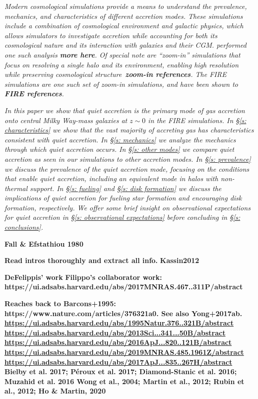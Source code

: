 \documentclass[fleqn,usenatbib]{mnras}
\begin{document}
\textit{
Modern cosmological simulations provide a means to understand the prevalence, mechanics, and characteristics of different accretion modes.
These simulations include a combination of cosmological environment and galactic physics, which allows simulators to investigate accretion while accounting for both its cosmological nature and its interaction with galaxies and their CGM.
\cite{Ho2019} performed one such analysis \textbf{more here}.
Of special note are ``zoom-in'' simulations that focus on resolving a single halo and its environment, enabling high resolution while preserving cosmological structure~\textbf{zoom-in references}.
The FIRE simulations are one such set of zoom-in simulations, and have been shown to \textbf{FIRE references}.
}

\textit{
In this paper we show that quiet accretion is the primary mode of gas accretion onto central Milky Way-mass galaxies at $z \sim 0$ in the FIRE simulations.
In \S\ref{s: characteristics} we show that the vast majority of accreting gas has characteristics consistent with quiet accretion.
In \S\ref{s: mechanics} we analyze the mechanics through which quiet accretion occurs.
In \S\ref{s: other modes} we compare quiet accretion as seen in our simulations to other accretion modes.
In \S\ref{s: prevalence} we discuss the prevalence of the quiet accretion mode, focusing on the conditions that enable quiet accretion, including an equivalent mode in halos with non-thermal support.
In \S\ref{s: fueling} and \S\ref{s: disk formation} we discuss the implications of quiet accretion for fueling star formation and encouraging disk formation, respectively.
We offer some brief insight on observational expectations for quiet accretion in \S\ref{s: observational expectations} before concluding in \S\ref{s: conclusions}.
}

\textbf{Fall \& Efstathiou 1980}

\textbf{Read intros thoroughly and extract all info.}
\textbf{Kassin2012}

\textbf{DeFelippis' work}
\textbf{
Filippo's collaborator work: https://ui.adsabs.harvard.edu/abs/2017MNRAS.467..311P/abstract
}

\cite{Huscher2020}
\cite{Rudie2019}

\textbf{
Reaches back to Barcons+1995: https://www.nature.com/articles/376321a0.
See also Yong+2017ab.
\url{https://ui.adsabs.harvard.edu/abs/1995Natur.376..321B/abstract}
\url{https://ui.adsabs.harvard.edu/abs/2013Sci...341...50B/abstract}
\url{https://ui.adsabs.harvard.edu/abs/2016ApJ...820..121B/abstract}
\url{https://ui.adsabs.harvard.edu/abs/2019MNRAS.485.1961Z/abstract}
\url{https://ui.adsabs.harvard.edu/abs/2017ApJ...835..267H/abstract}
Bielby et al. 2017; Péroux et al. 2017; Diamond-Stanic et al. 2016; Muzahid et al. 2016
Wong et al., 2004; Martin et al., 2012; Rubin et al., 2012; Ho \& Martin, 2020
}
\end{document}
